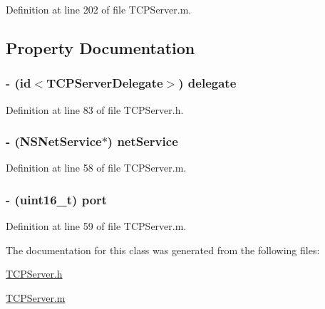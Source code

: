 Definition at line 202 of file TCPServer.m.



\subsection{Property Documentation}
\hypertarget{interface_t_c_p_server_a13a8a34ddb4e3e1d8175da5cbb575b94}{
\subsubsection[{delegate}]{\setlength{\rightskip}{0pt plus 5cm}-\/ (id$<${\bf TCPServerDelegate}$>$) delegate}}
\label{interface_t_c_p_server_a13a8a34ddb4e3e1d8175da5cbb575b94}


Definition at line 83 of file TCPServer.h.

\hypertarget{interface_t_c_p_server_a36376bb50bc0e6bba06d8508dd3bc61b}{
\subsubsection[{netService}]{\setlength{\rightskip}{0pt plus 5cm}-\/ (NSNetService$\ast$) netService}}
\label{interface_t_c_p_server_a36376bb50bc0e6bba06d8508dd3bc61b}


Definition at line 58 of file TCPServer.m.

\hypertarget{interface_t_c_p_server_a8e0798404bf2cf5dabb84c5ba9a4f236}{
\subsubsection[{port}]{\setlength{\rightskip}{0pt plus 5cm}-\/ (uint16\_\-t) port}}
\label{interface_t_c_p_server_a8e0798404bf2cf5dabb84c5ba9a4f236}


Definition at line 59 of file TCPServer.m.



The documentation for this class was generated from the following files:\begin{DoxyCompactItemize}
\item 
\hyperlink{_t_c_p_server_8h}{TCPServer.h}\item 
\hyperlink{_t_c_p_server_8m}{TCPServer.m}\end{DoxyCompactItemize}
